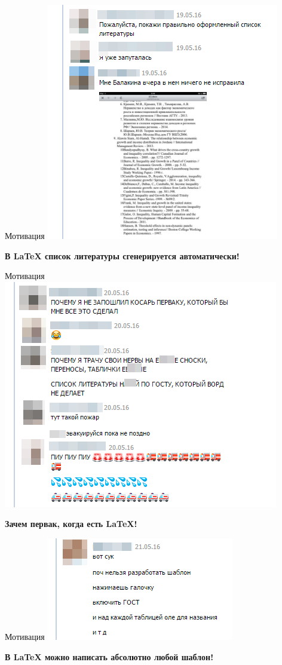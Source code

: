 \documentclass[newPxFont]{beamer}
\begin{document}
\begin{frame}{Мотивация}
    \centering
    \includegraphics[height=0.7\textheight]{m2.png}
    
    \vfill
    \alert{\textbf{В \LaTeX{} список литературы сгенерируется автоматически!}}
\end{frame}

\begin{frame}{Мотивация}
    \centering
    \includegraphics[height=0.7\textheight]{m4.png}
    
    \vfill
    \alert{\textbf{Зачем первак, когда есть \LaTeX{}!}}
\end{frame}


\begin{frame}{Мотивация}
    \centering
    \includegraphics[scale=0.5]{m5.png}
    
    \vfill
    \alert{\textbf{В \LaTeX{} можно написать абсолютно любой шаблон!}}
\end{frame}
\end{document}
